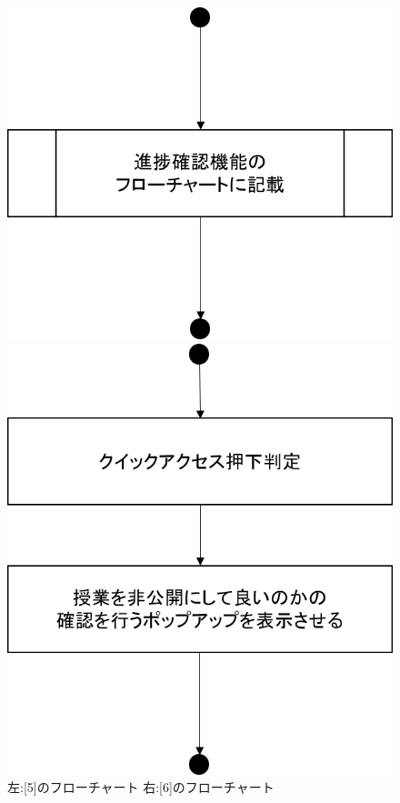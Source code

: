 \begin{figure}[htbp]
 \begin{minipage}{0.5\hsize}
  \begin{center}
   \includegraphics[width=0.45\linewidth,clip]{./img/start_lecture/sub5.png}
  \end{center}
 \end{minipage}
 \begin{minipage}{0.5\hsize}
  \begin{center}
   \includegraphics[width=0.45\linewidth,clip]{./img/start_lecture/sub6.png}
  \end{center}
 \end{minipage}
 \caption{左:[5]のフローチャート 右:[6]のフローチャート}\label{fig:startlectureflow2}
\end{figure}

